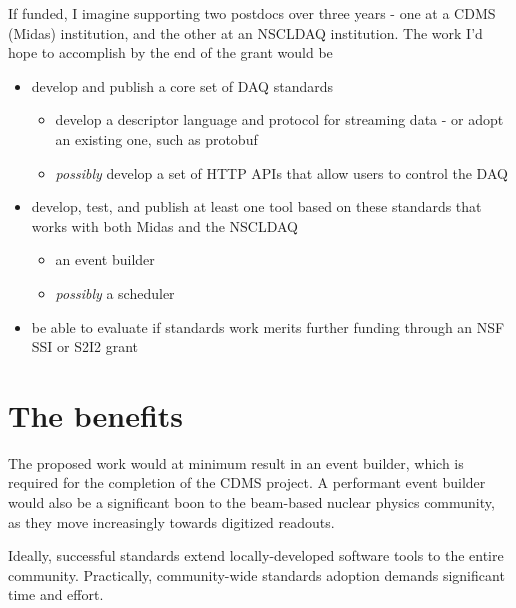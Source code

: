 \documentclass[]{report}   %
\begin{document}
If funded, I imagine supporting two postdocs over three years - one at a CDMS (Midas) institution, and the other at an NSCLDAQ institution.  The work I'd hope to accomplish by the end of the grant would be
\begin{itemize}
 \item develop and publish a core set of DAQ standards
 \begin{itemize}
   \item develop a descriptor language and protocol for streaming data - or adopt an existing one, such as protobuf
   \item \emph{possibly} develop a set of HTTP APIs that allow users to control the DAQ
 \end{itemize}

 \item develop, test, and publish at least one tool based on these standards that works with both Midas and the NSCLDAQ 
 \begin{itemize}
   \item an event builder
   \item \emph{possibly} a scheduler
 \end{itemize}

 \item be able to evaluate if standards work merits further funding through an NSF SSI or S2I2 grant
\end{itemize}


\section*{The benefits}
The proposed work would at minimum result in an event builder, which is required for the completion of the CDMS project.  A performant event builder would also be a significant boon to the beam-based nuclear physics community, as they move increasingly towards digitized readouts.  

Ideally, successful standards extend locally-developed software tools to the entire community. Practically, community-wide standards adoption demands significant time and effort. 
\end{document}
